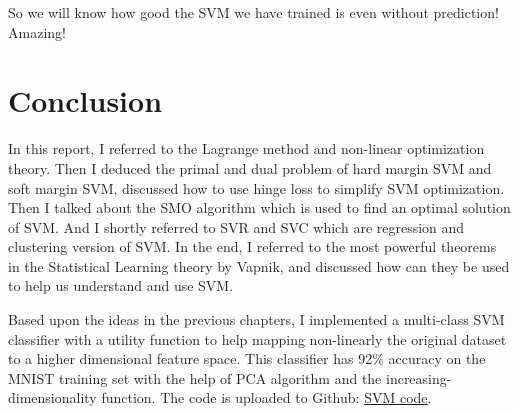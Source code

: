\documentclass[a4paper]{report}
\begin{document}
So we will know how good the SVM we have trained is even without prediction! Amazing!

\chapter{Conclusion}

In this report, I referred to the Lagrange method and non-linear optimization theory. Then I deduced the primal and dual problem of hard margin SVM and soft margin SVM, discussed how to use hinge loss to simplify SVM optimization. Then I talked about the SMO algorithm which is used to find an optimal solution of SVM. And I shortly referred to SVR and SVC which are regression and clustering version of SVM. In the end, I referred to the most powerful theorems in the Statistical
Learning theory by Vapnik, and discussed how can they be used to help us understand and use SVM. 

Based upon the ideas in the previous chapters, I implemented a multi-class SVM classifier with a utility function to help mapping non-linearly the original dataset to a higher dimensional feature space. This classifier has 92\% accuracy on the MNIST training set with the help of PCA algorithm and the increasing-dimensionality function. The code is uploaded to Github: \href{https://github.com/chaihahaha/Multiclass-Support-Vector-Machine-Tensorflow}{SVM code}.

{}

\end{document}
